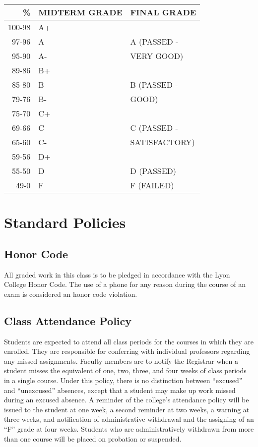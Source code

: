 \documentclass[11pt]{article}
\begin{document}
\begin{center}
\begin{tabular}{rll}
\hline
\textbf{\%} & \textbf{MIDTERM GRADE} & \textbf{FINAL GRADE}\\
\hline
100-98 & A+ & \\
97-96 & A & A (PASSED -\\
95-90 & A- & VERY GOOD)\\
\hline
89-86 & B+ & \\
85-80 & B & B (PASSED -\\
79-76 & B- & GOOD)\\
\hline
75-70 & C+ & \\
69-66 & C & C (PASSED -\\
65-60 & C- & SATISFACTORY)\\
\hline
59-56 & D+ & \\
55-50 & D & D (PASSED)\\
\hline
49-0 & F & F (FAILED)\\
\hline
\end{tabular}
\end{center}

\section{Standard Policies}
\label{sec:org3b1329f}
\subsection{Honor Code}
\label{sec:orgb33b690}

All graded work in this class is to be pledged in accordance with the
Lyon College Honor Code. The use of a phone for any reason during the
course of an exam is considered an honor code violation.

\subsection{Class Attendance Policy}
\label{sec:org8590db1}

Students are expected to attend all class periods for the courses in
which they are enrolled. They are responsible for conferring with
individual professors regarding any missed assignments. Faculty
members are to notify the Registrar when a student misses the
equivalent of one, two, three, and four weeks of class periods in a
single course. Under this policy, there is no distinction between
“excused” and “unexcused” absences, except that a student may make up
work missed during an excused absence. A reminder of the college’s
attendance policy will be issued to the student at one week, a second
reminder at two weeks, a warning at three weeks, and notification of
administrative withdrawal and the assigning of an “F” grade at four
weeks. Students who are administratively withdrawn from more than one
course will be placed on probation or suspended.
\end{document}
